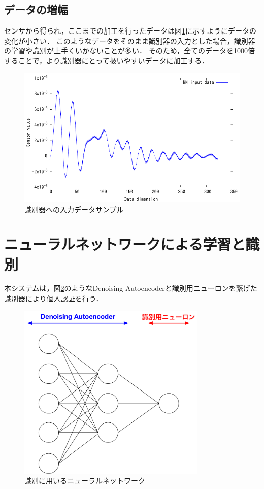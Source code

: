 \subsection{データの増幅}
センサから得られ，ここまでの加工を行ったデータは図\ref{data-sample}に示すようにデータの変化が小さい．
このようなデータをそのまま識別器の入力とした場合，識別器の学習や識別が上手くいかないことが多い．
そのため，全てのデータを1000倍することで，より識別器にとって扱いやすいデータに加工する．

\begin{figure}[hbtp]
  \centering
  \includegraphics[bb=0 0 360 216, width=12cm]{Graphs/data.pdf}
  \caption{識別器への入力データサンプル}
  \label{data-sample}
\end{figure}

\section{ニューラルネットワークによる学習と識別}
本システムは，図\ref{system-nn}のようなDenoising Autoencoderと識別用ニューロンを繋げた識別器により個人認証を行う．

\begin{figure}[hbtp]
  \centering
  \includegraphics[bb=0 0 622 587, width=9cm]{Figures/system-nn.pdf}
  \caption{識別に用いるニューラルネットワーク}
  \label{system-nn}
\end{figure}

